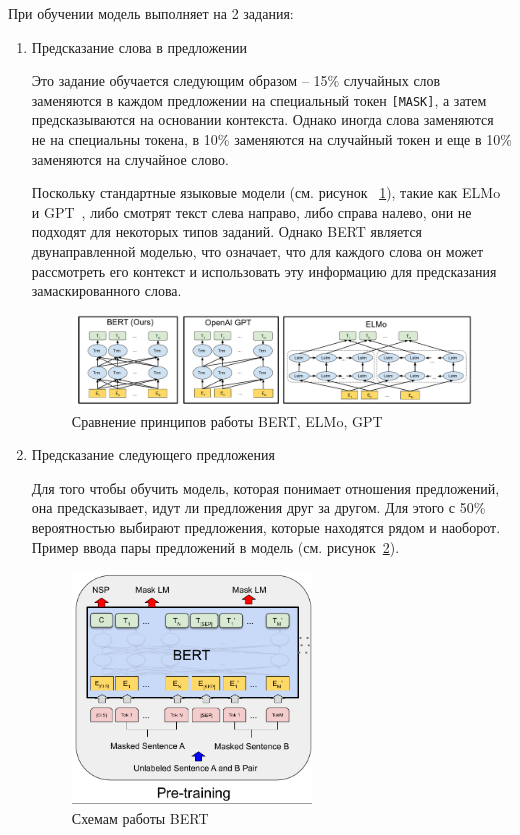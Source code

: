 \documentclass[PI, VKR]{HSEUniversity}
\begin{document}
При обучении модель выполняет на 2 задания:
\begin{enumerate}
\item Предсказание слова в предложении

Это задание обучается следующим образом -- 15\% случайных слов заменяются в каждом предложении на специальный токен \texttt{[MASK]}, а затем предсказываются на основании контекста. Однако иногда слова заменяются не на специальны токена, в 10\% заменяются на случайный токен и еще в 10\% заменяются на случайное слово.

Поскольку стандартные языковые модели (см. рисунок ~\ref{fig:BERT_comparisons}), такие как ELMo~\autocite{peters_deep_2018} и GPT~\autocite{radford_language_2019}, либо смотрят текст слева направо, либо справа налево, они не подходят для некоторых типов заданий. Однако BERT является двунаправленной моделью, что означает, что для каждого слова он может рассмотреть его контекст и использовать эту информацию для предсказания замаскированного слова.

\begin{figure}[h]
\centering
\includegraphics[width=.9\linewidth]{img/BERT_comparisons.pdf}
\caption{\label{fig:BERT_comparisons}Сравнение принципов работы BERT, ELMo, GPT}
\end{figure}
\item Предсказание следующего предложения

Для того чтобы обучить модель, которая понимает отношения предложений, она предсказывает, идут ли предложения друг за другом. Для этого с 50\% вероятностью выбирают предложения, которые находятся рядом и наоборот. Пример ввода пары предложений в модель (см. рисунок~\ref{fig:bert_pretrainin}).

\begin{figure}[h]
\centering
\includegraphics[width=0.6\textwidth]{img/bert_pretrainin.png}
\caption{\label{fig:bert_pretrainin}Схемам работы BERT}
\end{figure}
\end{enumerate}
\end{document}
